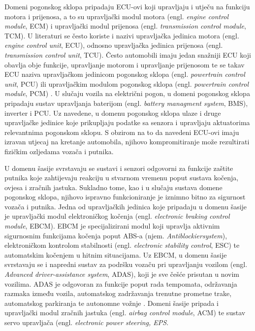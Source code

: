 \documentclass[times, utf8, diplomski, numeric]{fer}
\begin{document}
Domeni pogonskog sklopa pripadaju ECU-ovi koji upravljaju i utječu na funkciju motora i prijenosa, a to su upravljački modul motora (engl. \textit{engine control module}, ECM) i upravljački modul prijenosa (engl. \textit{transmission control module}, TCM). U literaturi se često koriste i nazivi upravljačka jedinica motora (engl. \textit{engine control unit}, ECU), odnosno upravljačka jedinica prijenosa (engl. \textit{transmission control unit}, TCU)\cite{nasser2023automotive, koscher2010}. Često automobili imaju jedan snažniji ECU koji obavlja obje funkcije, upravljanje motorom i upravljanje prijenosom te se takav ECU naziva upravljačkom jedinicom pogonskog sklopa (engl. \textit{powertrain control unit}, PCU) ili upravljačkim modulom pogonskog sklopa (engl. \textit{powertrain control module}, PCM) \cite{bosch2022handbook, ecutesting}. U slučaju vozila na električni pogon, u domeni pogonskog sklopa pripadaju sustav upravljanja baterijom (engl. \textit{battery managment system}, BMS), inverter  i PCU. Uz navedene, u domenu pogonskog sklopa ulaze i druge upravljačke jedinice koje prikupljaju podatke sa senzora i upravljaju aktuatorima relevantnima pogonskom sklopu. S obzirom na to da navedeni ECU-ovi imaju izravan utjecaj na kretanje automobila, njihovo kompromitiranje može rezultirati fizičkim ozljedama vozača i putnika.

U domenu šasije svrstavaju se sustavi i senzori odgovorni za funkcije zaštite putnika koje zahtijevaju reakciju u stvarnom vremenu poput sustava kočenja, ovjesa i zračnih jastuka. Sukladno tome, kao i u slučaju sustava domene pogonskog sklopa, njihovo ispravno funkcioniranje je iznimno bitno za sigurnost vozača i putnika\cite{nasser2023automotive}. Jedna od upravljačkih jedinica koje pripadaju u domenu šasije je upravljački modul elektroničkog kočenja (engl. \textit{electronic braking control module}, EBCM). EBCM je specijalizirani modul koji upravlja aktivnim sigurnosnim funkcijama kočenja poput ABS-a (njem. \textit{Antiblockiersystem}), elektroničkom kontrolom stabilnosti (engl. \textit{electronic stability control}, ESC) te automatskim kočenjem u hitnim situacijama. Uz EBCM, u domenu šasije svrstavaju se i napredni sustav za podršku vozaču pri upravljanju vozilom (engl. \textit{Advanced driver-assistance system}, ADAS), koji je sve češće prisutan u novim vozilima\cite{nasser2023automotive}. ADAS je odgovoran za funkcije poput rada tempomata, održavanja razmaka između vozila,  automatskog zadržavanja trenutne prometne trake, automatskog parkiranja te autonomne vožnje \cite{bosch2022handbook}. Domeni šasije pripada i upravljački modul zračnih jastuka (engl. \textit{airbag control module}, ACM) te sustav servo upravljača (engl. \textit{electronic power steering, EPS}.
\end{document}
